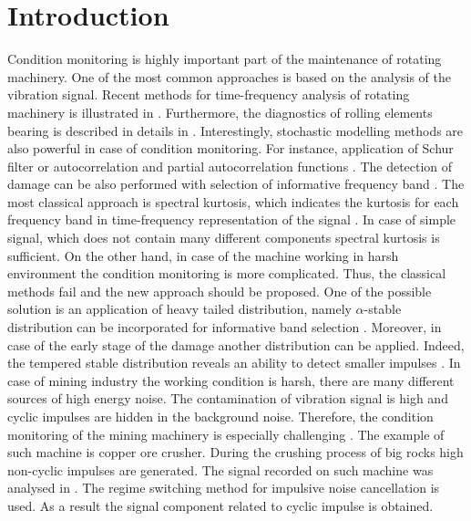 \documentclass[conference]{IEEEtran}
\begin{document}
\section{Introduction}
Condition monitoring is highly important part of the maintenance of rotating machinery. One of the most common approaches is based on the analysis of the vibration signal. Recent methods for time-frequency analysis of rotating machinery is illustrated in \cite{feng2013recent,obuchowski2014recent}. Furthermore, the diagnostics of rolling elements bearing is described in details in \cite{randall2011rolling}. Interestingly, stochastic modelling methods are also powerful in case of condition monitoring. For instance, application of Schur filter \cite{Makowski2014130, lopatka2005effective} or autocorrelation and partial autocorrelation functions \cite{zak2014novel}.
The detection of damage can be also performed with selection of informative frequency band \cite{obuchowski2014selection}. The most classical approach is spectral kurtosis, which indicates the kurtosis for each frequency band in time-frequency representation of the signal \cite{antoni2006spectral, combet2009optimal}. In case of simple signal, which does not contain many different components spectral kurtosis is sufficient. On the other hand, in case of the machine working in harsh environment the condition monitoring is more complicated. Thus, the classical methods fail and the new approach should be proposed. One of the possible solution is an application of heavy tailed distribution, namely $\alpha$-stable distribution can be incorporated for informative band selection \cite{zak2016data}. Moreover, in case of the early stage of the damage another distribution can be applied. Indeed, the tempered stable distribution reveals an ability to detect smaller impulses \cite{wylomanska2016application}. In case of mining industry the working condition is harsh, there are many different sources of high energy noise. The contamination of vibration signal is high and cyclic impulses are hidden in the background noise. Therefore, the condition monitoring of the mining machinery is especially challenging \cite{bartelmus2014object}. The example of such machine is copper ore crusher. During the crushing process of big rocks high non-cyclic impulses are generated. The signal recorded on such machine was analysed in \cite{wylomanskaimpulsive}. The regime switching method for impulsive noise cancellation is used. As a result the signal component related to cyclic impulse is obtained. 
\end{document}
